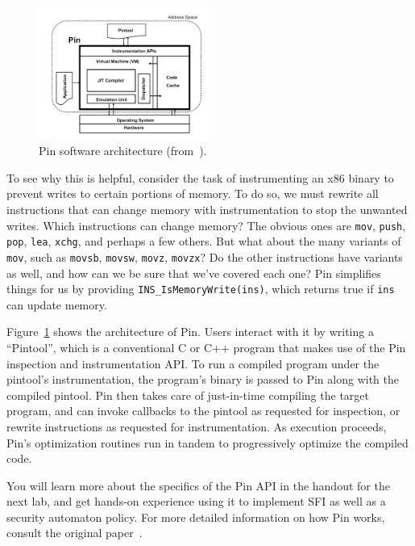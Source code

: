 \documentclass[11pt,twoside]{scrartcl}
\begin{document}
\begin{figure}[t]
\centering
\includegraphics[width=0.5\textwidth]{pin.pdf}
\caption{Pin software architecture (from~\cite{Luk2005}).}
\label{fig:pin}
\end{figure}

To see why this is helpful, consider the task of instrumenting an x86 binary to prevent writes to certain portions of memory. To do so, we must rewrite all instructions that can change memory with instrumentation to stop the unwanted writes. Which instructions can change memory? The obvious ones are \verb'mov', \verb'push', \verb'pop', \verb'lea', \verb'xchg', and perhaps a few others. But what about the many variants of \verb'mov', such as \verb'movsb', \verb'movsw', \verb'movz', \verb'movzx'? Do the other instructions have variants as well, and how can we be sure that we've covered each one? Pin simplifies things for us by providing \verb'INS_IsMemoryWrite(ins)', which returns true if \verb'ins' can update memory.

Figure~\ref{fig:pin} shows the architecture of Pin. Users interact with it by writing a ``Pintool'', which is a conventional C or C++ program that makes use of the Pin inspection and instrumentation API. To run a compiled program under the pintool's instrumentation, the program's binary is passed to Pin along with the compiled pintool. Pin then takes care of just-in-time compiling the target program, and can invoke callbacks to the pintool as requested for inspection, or rewrite instructions as requested for instrumentation. As execution proceeds, Pin's optimization routines run in tandem to progressively optimize the compiled code.

You will learn more about the specifics of the Pin API in the handout for the next lab, and get hands-on experience using it to implement SFI as well as a security automaton policy. For more detailed information on how Pin works, consult the original paper~\cite{Luk2005}.


\end{document}
